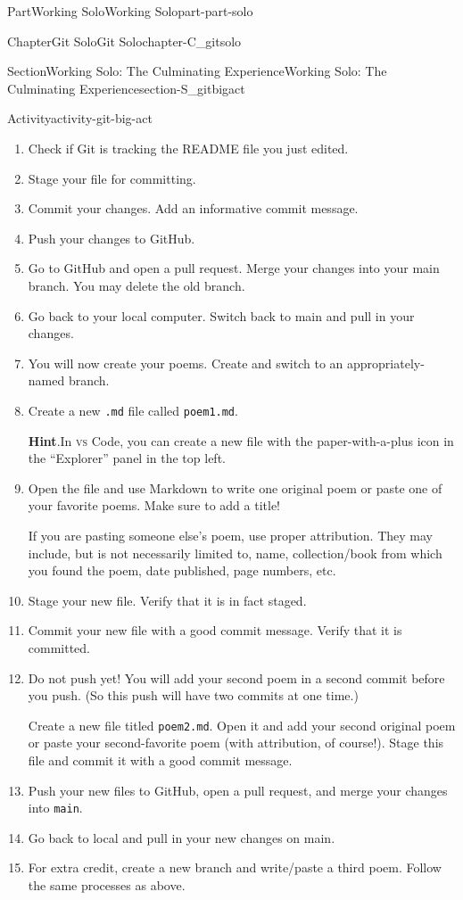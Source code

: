\documentclass[oneside,10pt,]{book}
\newcommand{\blocktitlefont}{\relax}
\newcommand{\mono}[1]{\texttt{#1}}
\newcommand{\initialism}[1]{\textsc{\MakeLowercase{#1}}}
\begin{document}
\begin{partptx}{Part}{Working Solo}{}{Working Solo}{}{}{part-part-solo}
\begin{chapterptx}{Chapter}{Git Solo}{}{Git Solo}{}{}{chapter-C_gitsolo}
\begin{sectionptx}{Section}{Working Solo: The Culminating Experience}{}{Working Solo: The Culminating Experience}{}{}{section-S_gitbigact}
\begin{activity}{Activity}{}{activity-git-big-act}
\begin{enumerate}[font=\bfseries,label=(\alph*),ref=\alph*]
\item{}Check if Git is tracking the README file you just edited.%
\item{}Stage your file for committing.%
\item{}Commit your changes. Add an informative commit message.%
\item{}Push your changes to GitHub.%
\item{}Go to GitHub and open a pull request. Merge your changes into your main branch. You may delete the old branch.%
\item{}Go back to your local computer. Switch back to main and pull in your changes.%
\item{}You will now create your poems. Create and switch to an appropriately-named branch.%
\item{}Create a new \mono{.md} file called \mono{poem1.md}.%
\par\smallskip%
\noindent\textbf{\blocktitlefont Hint}.\hypertarget{hint-git-big-act-m-b}{}\quad{}In \initialism{VS} Code, you can create a new file with the paper-with-a-plus icon in the ``Explorer'' panel in the top left.%
\item{}Open the file and use Markdown to write one original poem or paste one of your favorite poems. Make sure to add a title!%
\par
If you are pasting someone else's poem, use proper attribution. They may include, but is not necessarily limited to, name, collection\slash{}book from which you found the poem, date published, page numbers, etc.%
\item{}Stage your new file. Verify that it is in fact staged.%
\item{}Commit your new file with a good commit message. Verify that it is committed.%
\item{}Do not push yet! You will add your second poem in a second commit before you push. (So this push will have two commits at one time.)%
\par
Create a new file titled \mono{poem2.md}. Open it and add your second original poem or paste your second-favorite poem (with attribution, of course!). Stage this file and commit it with a good commit message.%
\item{}Push your new files to GitHub, open a pull request, and merge your changes into \mono{main}.%
\item{}Go back to local and pull in your new changes on main.%
\item{}For extra credit, create a new branch and write\slash{}paste a third poem. Follow the same processes as above.%

\end{enumerate}
\end{activity}
\end{sectionptx}
\end{chapterptx}
\end{partptx}
\end{document}
